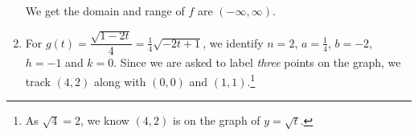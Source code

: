 \documentclass{ximera}
\begin{document}
\begin{example}
\begin{enumerate}









 


 \begin{center}
 \end{center}
 
 We get the domain and range of $f$ are $(-\infty, \infty)$.
 
 \item  For $g(t) = \dfrac{\sqrt{1-2t}}{4} = \frac{1}{4} \sqrt{-2t+1}$, we identify $n=2$, $a = \frac{1}{4}$, $b = -2$, $h = -1$ and $k =0$.  Since we are asked to label \textit{three} points on the graph, we track $(4,2)$ along with $(0,0)$ and $(1,1)$.\footnote{As $\sqrt{4} = 2$, we know $(4,2)$ is on the graph of $y = \sqrt{t}$.}



\end{enumerate}
\end{example}
\end{document}
